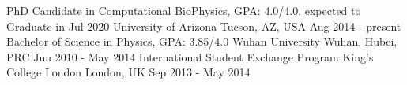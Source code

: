 
\begin{cventries}
  \cventry
    {PhD Candidate in Computational BioPhysics, GPA: 4.0/4.0, expected to Graduate in Jul 2020} %
    {University of Arizona} %
    {Tucson, AZ, USA} %
    {Aug 2014 - present} %
    {}
  \cventry
    {Bachelor of Science in Physics, GPA: 3.85/4.0} %
    {Wuhan University} %
    {Wuhan, Hubei, PRC} %
    {Jun 2010 - May 2014} %
    {}    
  \cventry
    {International Student Exchange Program} %
    {King's College London} %
    {London, UK} %
    {Sep 2013 - May 2014} %
    {}    
\end{cventries}
